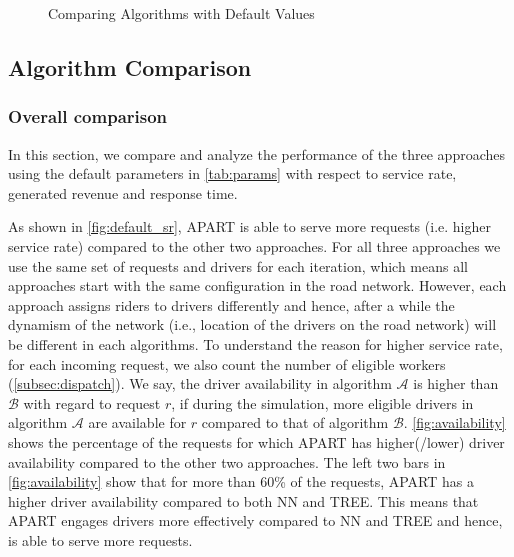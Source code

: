 \begin{figure}[]
    \centering
    \vspace{-0.15in}
    \caption{Comparing Algorithms with Default Values}
    \label{fig:defaults}
\end{figure}

\subsection{Algorithm Comparison}

\subsubsection{Overall comparison}
In this section, we compare and analyze the performance of the three approaches using the default parameters in \cref{tab:params} with respect to service rate, generated revenue and response time.

As shown in \cref{fig:default_sr}, APART is able to serve more requests (i.e. higher service rate) compared to the other two approaches. For all three approaches we use the same set of requests and drivers for each iteration, which means all approaches start with the same configuration in the road network. However, each approach assigns riders to drivers differently and hence, after a while the dynamism of the network (i.e., location of the drivers on the road network) will be different in each algorithms. To understand the reason for higher service rate, for each incoming request, we also count the number of eligible workers (\cref{subsec:dispatch}). We say, the driver availability in algorithm $\mathcal{A}$ is higher than $\mathcal{B}$ with regard to request $r$, if during the simulation, more eligible drivers in algorithm $\mathcal{A}$ are available for $r$ compared to that of algorithm $\mathcal{B}$. \cref{fig:availability} shows the percentage of the requests for which APART has higher(/lower) driver availability compared to the other two approaches. The left two bars in \cref{fig:availability} show that for more than 60\% of the requests, APART has a higher driver availability compared to both NN and TREE. This means that APART engages drivers more effectively compared to NN and TREE and hence, is able to serve more requests.

